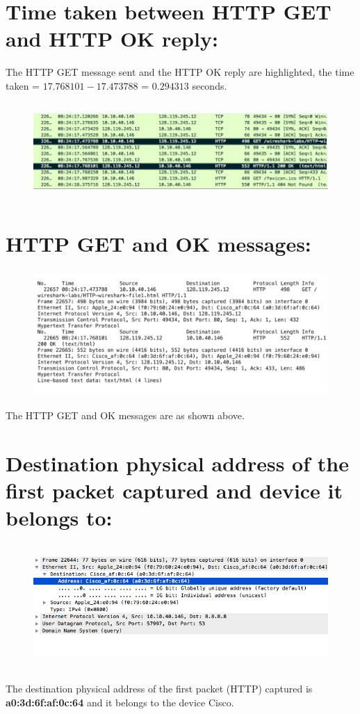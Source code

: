 \documentclass[]{report}
\begin{document}
\section{Time taken between HTTP GET and HTTP OK reply:}
The HTTP GET message sent and the HTTP OK reply are highlighted, the time taken = $17.768101 - 17.473788$ = $0.294313$ seconds.
\begin{figure}[H]
	\vspace{0pt}
	\includegraphics[height = 105pt, keepaspectratio]{Snapshots/q8.png}
\end{figure}

\section{HTTP GET and OK messages:}
\begin{figure}[H]
	\vspace{0pt}
	\includegraphics[height = 135pt, keepaspectratio]{Snapshots/q10.png}
\end{figure}
The HTTP GET and OK messages are as shown above.
\section{Destination physical address of the first packet captured and device it belongs to:}
\begin{figure}[H]
	\vspace{0pt}
	\includegraphics[height = 135pt, keepaspectratio]{Snapshots/q11.png}
\end{figure}
The destination physical address of the first packet (HTTP) captured is \textbf{a0:3d:6f:af:0c:64} and it belongs to the device Cisco.
\end{document}
